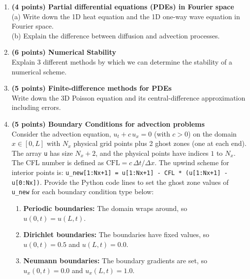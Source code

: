 \documentclass[12pt,a4paper]{extarticle}
\begin{document}
\begin{enumerate}

\item {\bf (4 points) Partial differential equations (PDEs) in Fourier space}\\
(a) Write down the 1D heat equation and the 1D one-way wave equation in Fourier space.\\
(b) Explain the difference between diffusion and advection processes.\vspace{8cm}


\item {\bf (6 points) Numerical Stability}\\
Explain 3 different methods by which we can determine the stability of a numerical scheme.\newpage

\item {\bf (5 points) Finite-difference methods for PDEs}\\
Write down the 3D Poisson equation and its central-difference approximation including errors.\vspace{9cm}


\item {\bf (5 points) Boundary Conditions for advection problems}\\
Consider the advection equation, $u_t + c\,u_x = 0$ (with $c>0$) on the domain $x \in [0, L]$ with $N_x$ physical grid points plus 2 ghost zones (one at each end). The array \lstinline{u} has size $N_x+2$, and the physical points have indices $1$ to $N_x$. The CFL number is defined as $\text{CFL} = c\,\Delta t / \Delta x$. The upwind scheme for interior points is: \lstinline{u_new[1:Nx+1] = u[1:Nx+1] - CFL * (u[1:Nx+1] - u[0:Nx])}. Provide the Python code lines to set the ghost zone values of \lstinline{u_new} for each boundary condition type below:
\begin{enumerate}[label=\arabic*.]
    \item \textbf{Periodic boundaries:}
    The domain wraps around, so $u(0,t) = u(L,t)$.
    \item \textbf{Dirichlet boundaries:}
    The boundaries have fixed values, so $u(0,t)=0.5$ and $u(L,t)=0.0$.
    \item \textbf{Neumann boundaries:}
    The boundary gradients are set, so $u_x(0,t)=0.0$ and $u_x(L,t)=1.0$.
\end{enumerate}

\end{enumerate}
\end{document}
